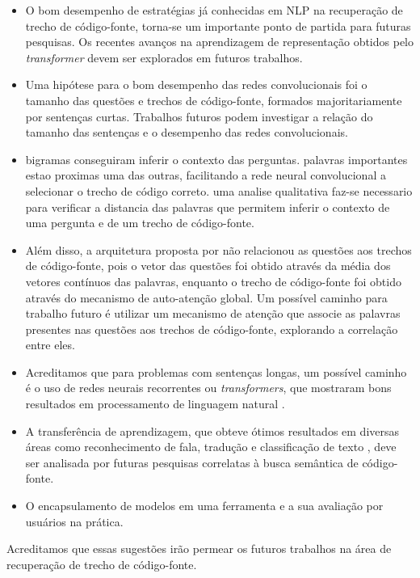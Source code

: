 \begin{itemize}
    \item O bom desempenho de estratégias já conhecidas em NLP na recuperação de trecho de código-fonte, torna-se um importante ponto de partida para futuras pesquisas. Os recentes avanços na aprendizagem de representação obtidos pelo \textit{transformer} devem ser explorados em futuros trabalhos. 
    \item Uma hipótese para o bom desempenho das redes convolucionais foi o tamanho das questões e trechos de código-fonte, formados majoritariamente por sentenças curtas. Trabalhos futuros podem investigar a relação do tamanho das sentenças e o desempenho das redes convolucionais.
    \item bigramas conseguiram inferir o contexto das perguntas. palavras importantes estao proximas uma das outras, facilitando a rede neural convolucional a selecionar o trecho de código correto. uma analise qualitativa faz-se necessario para verificar a distancia das palavras que permitem inferir o contexto de uma pergunta e de um trecho de código-fonte.
    \item Além disso, a arquitetura proposta por \cite{cambronero-deep-learning-code-search:2019} não relacionou as questões aos trechos de código-fonte, pois o vetor das questões foi obtido através da média dos vetores contínuos das palavras, enquanto o trecho de código-fonte foi obtido através do mecanismo de auto-atenção global. Um possível caminho para trabalho futuro é utilizar um mecanismo de atenção que associe as palavras presentes nas questões aos trechos de código-fonte, explorando a correlação entre eles.
    \item Acreditamos que para problemas com sentenças longas, um possível caminho é o uso de redes neurais recorrentes ou \textit{transformers}, que mostraram bons resultados em processamento de linguagem natural \citep{devlin-etal-2019-bert}. 
    \item  A transferência de aprendizagem, que obteve ótimos resultados em diversas áreas como reconhecimento de fala, tradução e classificação de texto \citep{devlin-etal-2019-bert}, deve ser analisada por futuras pesquisas correlatas à busca semântica de código-fonte.
    \item O encapsulamento de modelos em uma ferramenta e a sua avaliação por usuários na prática.
\end{itemize}

Acreditamos que essas sugestões irão permear os futuros trabalhos na área de recuperação de trecho de código-fonte. 